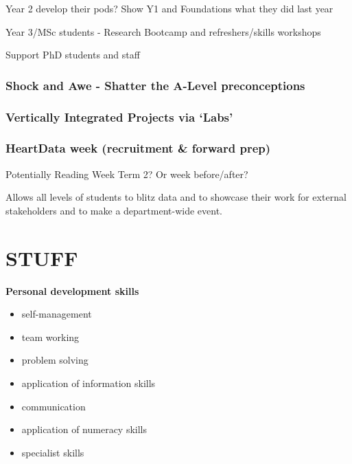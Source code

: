 \documentclass[
  11pt,
  letterpaper,
  oneside,
  open=any]{scrbook}
\begin{document}
Year 2 develop their pods? Show Y1 and Foundations what they did last
year

Year 3/MSc students - Research Bootcamp and refreshers/skills workshops

Support PhD students and staff

\hypertarget{shock-and-awe---shatter-the-a-level-preconceptions}{%
\subsection{Shock and Awe - Shatter the A-Level
preconceptions}\label{shock-and-awe---shatter-the-a-level-preconceptions}}

\hypertarget{vertically-integrated-projects-via-labs}{%
\subsection{Vertically Integrated Projects via
`Labs'}\label{vertically-integrated-projects-via-labs}}

\hypertarget{heartdata-week-recruitment-forward-prep}{%
\subsection{HeartData week (recruitment \& forward
prep)}\label{heartdata-week-recruitment-forward-prep}}

Potentially Reading Week Term 2? Or week before/after?

Allows all levels of students to blitz data and to showcase their work
for external stakeholders and to make a department-wide event.


\hypertarget{stuff}{%
\chapter{STUFF}\label{stuff}}

\textbf{Personal development skills}

\begin{itemize}
\item
  self-management
\item
  team working
\item
  problem solving
\item
  application of information skills
\item
  communication
\item
  application of numeracy skills
\item
  specialist skills
\end{itemize}
\end{document}
